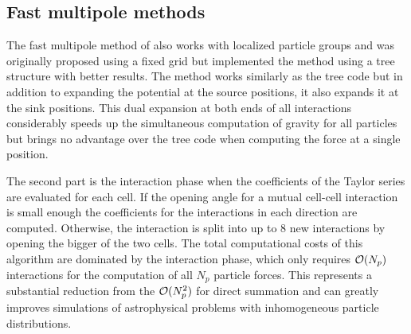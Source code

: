 \subsection{Fast multipole methods}
The fast multipole method of \textcite{1987JCoPh..73..325G} also works with localized particle groups and was originally proposed using a fixed grid but \textcite{2000ApJ...536L..39D} implemented the method using a tree structure with better results. The method works similarly as the tree code but in addition to expanding the potential at the source positions, it also expands it at the sink positions. This dual expansion at both ends of all interactions considerably speeds up the simultaneous computation of gravity for all particles but brings no advantage over the tree code when computing the force at a single position.

The second part is the interaction phase when the coefficients of the Taylor series are evaluated for each cell. If the opening angle for a mutual cell-cell interaction is small enough the coefficients for the interactions in each direction are computed.  Otherwise, the interaction is split into up to 8 new interactions by opening the bigger of the two cells. The total computational
costs of this algorithm are dominated by the interaction phase, which only requires $\mathcal{O}(N_p)$ interactions for the computation of all $N_p$ particle forces. This represents a substantial reduction from the $\mathcal{O}(N_p^2)$ for direct summation and can greatly improves simulations of astrophysical problems with inhomogeneous particle distributions.
